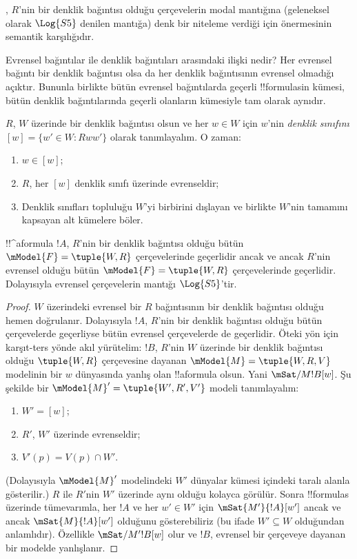 \documentclass[../../../include/open-logic-section]{subfiles}
\begin{document}
, $R$'nin bir denklik bağıntısı olduğu
çerçevelerin modal mantığına (geleneksel olarak $\Log{S5}$ denilen mantığa)
denk bir niteleme verdiği için  önermesinin
semantik karşılığıdır.

Evrensel bağıntılar ile denklik bağıntıları arasındaki ilişki nedir? Her
evrensel bağıntı bir denklik bağıntısı olsa da her denklik bağıntısının
evrensel olmadığı açıktır. Bununla birlikte bütün evrensel bağıntılarda
geçerli !!{formula}s{}in kümesi, bütün denklik bağıntılarında geçerli
olanların kümesiyle tam olarak aynıdır.

\begin{prop}
  $R$, $W$ üzerinde bir denklik bağıntısı olsun ve her $w\in W$ için $w$'nin
  \emph{denklik sınıfını} $[w]=\{w'\in W:Rww'\}$ olarak tanımlayalım. O
  zaman:
  \begin{enumerate}
  \item $w\in[w]$;
  \item $R$, her $[w]$ denklik sınıfı üzerinde evrenseldir;
  \item Denklik sınıfları topluluğu $W$'yi birbirini dışlayan ve birlikte
    $W$'nin tamamını kapsayan alt kümelere böler.
  \end{enumerate}
\end{prop}

\begin{prop}
  !!^a{formula} $!A$, $R$'nin bir denklik bağıntısı olduğu bütün
  $\mModel{F}=\tuple{W,R}$ çerçevelerinde geçerlidir ancak ve ancak $R$'nin
  evrensel olduğu bütün $\mModel{F}=\tuple{W,R}$ çerçevelerinde geçerlidir.
  Dolayısıyla evrensel çerçevelerin mantığı $\Log{S5}$'tir.
\end{prop}

\begin{proof}
  $W$ üzerindeki evrensel bir $R$ bağıntısının bir denklik bağıntısı olduğu
  hemen doğrulanır. Dolayısıyla $!A$, $R$'nin bir denklik bağıntısı olduğu
  bütün çerçevelerde geçerliyse bütün evrensel çerçevelerde de geçerlidir.
  Öteki yön için karşıt-ters yönde akıl yürütelim: $!B$, $R$'nin $W$
  üzerinde bir denklik bağıntısı olduğu $\tuple{W,R}$ çerçevesine dayanan
  $\mModel{M}=\tuple{W,R,V}$ modelinin bir $w$ dünyasında yanlış olan
  !!a{formula} olsun. Yani $\mSat/{M}{!B}[w]$. Şu şekilde bir
  $\mModel{M}'=\tuple{W',R',V'}$ modeli tanımlayalım:
  \begin{enumerate}
  \item $W'=[w]$;
  \item $R'$, $W'$ üzerinde evrenseldir;
  \item $V'(p)=V(p)\cap W'$.
  \end{enumerate}
  (Dolayısıyla $\mModel{M}'$ modelindeki $W'$ dünyalar kümesi
   içindeki taralı alanla gösterilir.) $R$ ile $R'$nin
  $W'$ üzerinde aynı olduğu kolayca görülür. Sonra !!{formula}s üzerinde
  tümevarımla, her $!A$ ve her $w'\in W'$ için
  $\mSat{M'}{!A}[w']$ ancak ve ancak $\mSat{M}{!A}[w']$ olduğunu gösterebiliriz
  (bu ifade $W'\subseteq W$ olduğundan anlamlıdır). Özellikle
  $\mSat/{M'}{!B}[w]$ olur ve $!B$, evrensel bir çerçeveye dayanan bir
  modelde yanlışlanır.
\end{proof}
\end{document}
